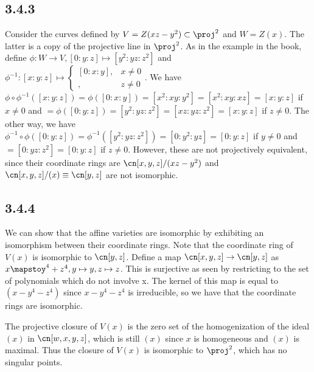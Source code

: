 \documentclass{article}
\begin{document}
\subsection*{3.4.3}
Consider the curves defined by $V=Z(xz-y^2)\subset\proj^2$ and $W=Z(x)$. The latter is a copy of the projective line in $\proj^2$. As in the example in the book, define $\phi:W\to V, [0:y:z]\mapsto [y^2:yz:z^2]$ and $\phi^{-1}:[x:y:z]\mapsto\begin{cases}[0:x:y],&x\neq0\\[0:y:z],&z\neq0\end{cases}$. We have $\phi\circ\phi^{-1}([x:y:z])=\phi([0:x:y])=[x^2:xy:y^2]=[x^2:xy:xz]=[x:y:z]$ if $x\neq0$ and $=\phi([0:y:z])=[y^2:yz:z^2]=[xz:yz:z^2]=[x:y:z]$ if $z\neq0$. The other way, we have $\phi^{-1}\circ\phi([0:y:z])=\phi^{-1}([y^2:yz:z^2])=[0:y^2:yz]=[0:y:z]$ if $y\neq0$ and $=[0:yz:z^2]=[0:y:z]$ if $z\neq0$. However, these are not projectively equivalent, since their coordinate rings are $\cn[x,y,z]/(xz-y^2)$ and $\cn[x,y,z]/(x)\equiv\cn[y,z]$ are not isomorphic.
\subsection*{3.4.4}
We can show that the affine varieties are isomorphic by exhibiting an isomorphism between their coordinate rings. Note that the coordinate ring of $V(x)$ is isomorphic to $\cn[y,z]$. Define a map $\cn[x,y,z]\to\cn[y,z]$ as $x\mapstoy^4+z^4, y\mapsto y, z\mapsto z$. This is surjective as seen by restricting to the set of polynomials which do not involve x. The kernel of this map is equal to $(x-y^4-z^4)$ since $x-y^4-z^4$ is irreducible, so we have that the coordinate rings are isomorphic.

The projective closure of $V(x)$ is the zero set of the homogenization of the ideal $(x)$ in $\cn[w,x,y,z]$, which is still $(x)$ since $x$ is homogeneous and $(x)$ is maximal. Thus the closure of $V(x)$ is isomorphic to $\proj^2$, which has no singular points. 
\end{document}
